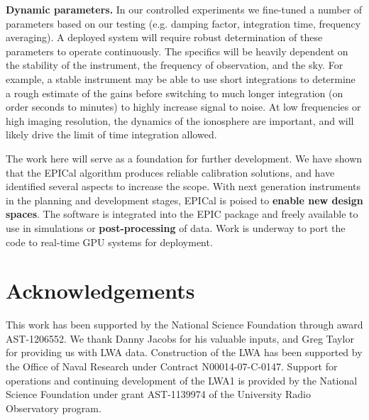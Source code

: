 \documentclass[a4paper,fleqn,usenatbib]{../mnras}
\begin{document}
\textbf{Dynamic parameters.} In our controlled experiments we fine-tuned a number of 
parameters based on our testing (e.g. damping factor, integration time, frequency averaging). A 
deployed system will require robust determination of these parameters to operate continuously. 
The specifics will be heavily dependent on the stability of the instrument, the frequency of 
observation, and the sky. For example, a stable instrument may be able to use short 
integrations to determine a rough estimate of the gains before switching to much longer 
integration (on order seconds to minutes) to highly increase signal to noise. At low frequencies 
or high imaging resolution, the dynamics of the ionosphere are important, and will likely drive 
the limit of time integration allowed.

The work here will serve as a foundation for further development. We have shown that the 
EPICal algorithm produces reliable calibration solutions, and have identified several aspects to 
increase the scope. With next generation instruments in the planning and development stages, 
EPICal is poised to \textbf{enable new design spaces}. The software is integrated into the EPIC 
package and freely available to use in simulations or \textbf{post-processing} of data. Work is 
underway to port the code to real-time GPU systems for deployment. 

\section*{Acknowledgements}
This work has been supported by the National Science Foundation through award 
AST-1206552. We thank Danny Jacobs for his valuable inputs, and Greg Taylor for providing 
us with LWA data. Construction of the LWA has been supported by the Office of Naval 
Research under Contract N00014-07-C-0147. Support for operations and continuing 
development of the LWA1 is provided by the National Science Foundation under grant 
AST-1139974 of the University Radio Observatory program.






%

\bsp	%
\label{lastpage}
\end{document}
